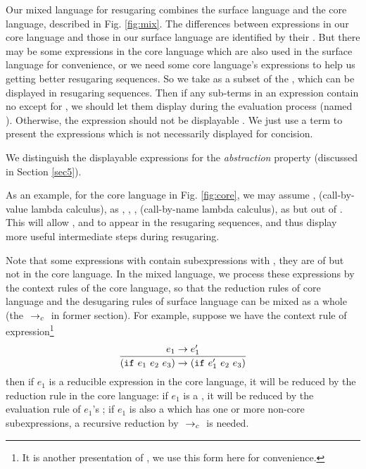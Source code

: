 Our mixed language for resugaring combines the surface language and the core language, described in Fig.  \ref{fig:mix}.
%
The differences between expressions in our core language and those in our surface language are identified by their . But there may be some expressions in the core language which are also used in the surface language for convenience, or  we need some core language's expressions to help us getting  better resugaring sequences. So we take  as a subset of the , which can be displayed in resugaring sequences. Then if any sub-terms in an expression contain no  except for , we should let them display during the evaluation process (named ). Otherwise, the expression should not be displayable . We just use a  term to present the expressions which is not necessarily displayed for concision.

We distinguish the displayable expressions for the \emph{abstraction} property (discussed in Section \ref{sec5}).


As an example, for the core language in Fig.  \ref{fig:core},
we may assume ,  (call-by-value lambda calculus),  as , , ,  (call-by-name lambda calculus),  as  but out of . This will allow ,  and  to appear in the resugaring sequences, and thus display more useful intermediate steps during resugaring.

Note that some expressions with  contain subexpressions with , they are of  but not in the core language. In the mixed language, we process these expressions by the context rules of the core language, so that the reduction rules of core language and the desugaring rules of surface language can be mixed as a whole (the $~\rightarrow_c~$ in former section). For example, suppose we have the context rule of  expression\footnote{It is another presentation of , we use this form here for convenience.}
\[
\infer{(\m{if}~e_1~e_2~e_3) \rightarrow (\m{if}~e_1'~e_2~e_3)}{e_1 \rightarrow e_1'}
\]
then if $e_1$ is a reducible expression in the core language, it will be reduced by the reduction rule in the core language: if $e_1$ is a , it will be reduced by the evaluation rule of $e_1$'s ; if $e_1$ is also a  which has one or more non-core subexpressions, a recursive reduction by $~\rightarrow_c~$ is needed.


